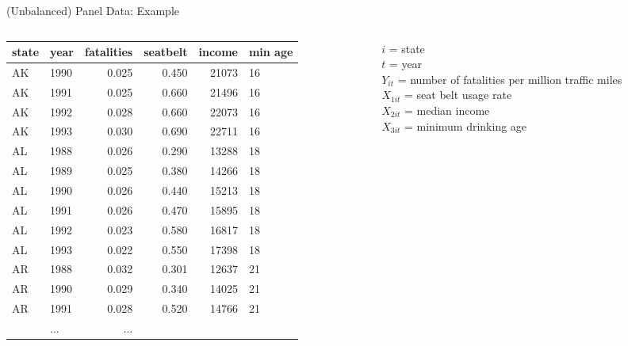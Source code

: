 \documentclass[11pt, aspectratio = 169]{beamer}
\begin{document}
\begin{frame}{(Unbalanced) Panel Data: Example}
\begin{columns}
    \begin{column}{.7\linewidth}
        \small \centering
    \begin{tabular}{l|l|r|r|r|l}
\toprule
state & year & fatalities & seatbelt & income & min age\\
\hline
\color{blue} AK & 1990 & 0.025 & 0.450 & 21073 & 16 \\
\color{blue}AK & 1991 & 0.025 & 0.660 & 21496& 16\\
\color{blue}AK & 1992 & 0.028 & 0.660 & 22073& 16\\
\color{blue}AK & 1993 & 0.030 & 0.690 & 22711& 16\\
\color{teal} AL & 1988 & 0.026 & 0.290 & 13288& 18\\
\color{teal}  AL & 1989 & 0.025 & 0.380 & 14266& 18\\
\color{teal} AL & 1990 & 0.026 & 0.440 & 15213& 18\\
\color{teal} AL & 1991 & 0.026 & 0.470 & 15895& 18\\
\color{teal} AL & 1992 & 0.023 & 0.580 & 16817& 18\\
\color{teal} AL & 1993 & 0.022 & 0.550 & 17398& 18\\
AR & 1988 & 0.032 & 0.301 & 12637& 21\\
AR & 1990 & 0.029 & 0.340 & 14025& 21\\
AR & 1991 & 0.028 & 0.520 & 14766& 21\\
&...&...&&\\
\bottomrule
\end{tabular}
    \end{column}

        \begin{column}{.353\linewidth}
        $i$ = state \\
        $t$ = year \\
        $Y_{it}$ = number of fatalities per \hspace*{+.69cm} million traffic miles  \\
        $X_{1it}$ = seat belt usage rate \\
         $X_{2it}$ = median income \\
         $X_{3it}$ = minimum drinking age

    \end{column}
\end{columns}

\end{frame}
\end{document}
